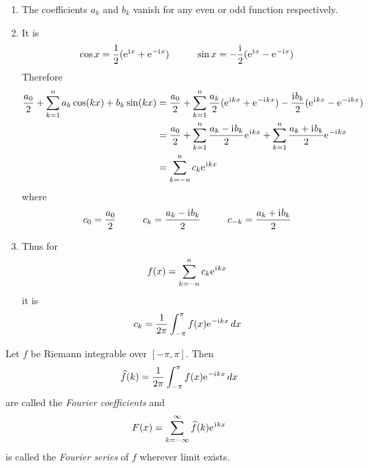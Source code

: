 \begin{remarks}\hfill
	\begin{enumerate}
		\item The coefficients \( a_k \) and \( b_k \) vanish for any even or odd function respectively.
		\item It is
		      \[
			      \cos x = \frac{1}{2} (\mathrm{e}\mkern1mu^{\mathrm{i}\mkern1mu x} + \mathrm{e}\mkern1mu^{-\mathrm{i}\mkern1mu x}) \mspace{50mu}
			      \sin x = -\frac{\mathrm{i}\mkern1mu}{2} (\mathrm{e}\mkern1mu^{\mathrm{i}\mkern1mu x} - \mathrm{e}\mkern1mu^{-\mathrm{i}\mkern1mu x})
		      \]
		      Therefore
		      \[
			      \begin{split}
				      \frac{a_0}{2} + \sum_{k = 1}^n a_k \cos(kx) + b_k \sin(kx)
				      & = \frac{a_0}{2} + \sum_{k = 1}^n \frac{a_k}{2} (\mathrm{e}\mkern1mu^{\mathrm{i}\mkern1mu kx} + \mathrm{e}\mkern1mu^{-\mathrm{i}\mkern1mu kx}) -
				      \frac{\mathrm{i}\mkern1mu b_k}{2} (\mathrm{e}\mkern1mu^{\mathrm{i}\mkern1mu kx} - \mathrm{e}\mkern1mu^{-\mathrm{i}\mkern1mu kx}) \\
				      & = \frac{a_0}{2} + \sum_{k = 1}^n \frac{a_k - \mathrm{i}\mkern1mu b_k}{2} \mathrm{e}\mkern1mu^{\mathrm{i}\mkern1mu kx} +
				      \sum_{k=1}^n\frac{a_k + \mathrm{i}\mkern1mu b_k}{2} \mathrm{e}\mkern1mu^{-\mathrm{i}\mkern1mu kx} \\
				      & = \sum_{k=-n}^n c_k \mathrm{e}\mkern1mu^{\mathrm{i}\mkern1mu kx}
			      \end{split}
		      \]
		      where
		      \[
			      c_0 = \frac{a_0}{2} \mspace{50mu} c_k = \frac{a_k - \mathrm{i}\mkern1mu b_k}{2} \mspace{50mu} c_{-k} = \frac{a_k + \mathrm{i}\mkern1mu b_k}{2}
		      \]
		\item Thus for
		      \[
			      f(x) = \sum_{k=-n}^n c_k \mathrm{e}\mkern1mu^{\mathrm{i}\mkern1mu kx}
		      \]
		      it is
		      \[
				c_k = \frac{1}{2\pi} \int_{-\pi}^\pi f(x) \mathrm{e}\mkern1mu^{-\mathrm{i}\mkern1mu kx}\,dx
		      \]
	\end{enumerate}
\end{remarks}
\bigskip


\begin{definition}
	Let \( f \) be Riemann integrable over \( [-\pi,\pi] \). Then
	\[
		\widehat{f}(k) = \frac{1}{2\pi} \int_{-\pi}^\pi f(x) \mathrm{e}\mkern1mu^{-\mathrm{i}\mkern1mu kx}\,dx
	\]
	are called the \emph{Fourier coefficients} and
	\[
		F(x) = \sum_{k=-\infty}^\infty \widehat{f}(k) \mathrm{e}\mkern1mu^{\mathrm{i}\mkern1mu kx}
	\]
	is called the \emph{Fourier series} of \( f\) wherever limit exists.
\end{definition}
\bigskip

